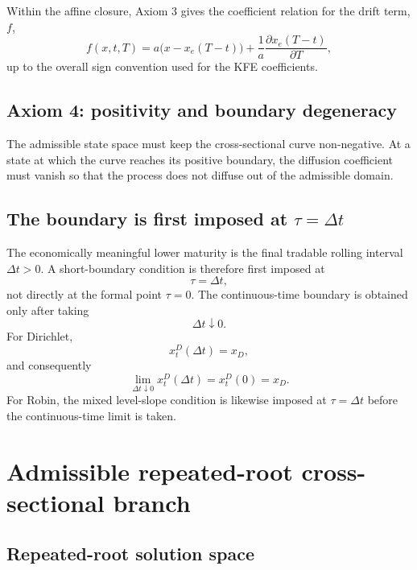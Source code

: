 \documentclass[12pt]{article}
\numberwithin{equation}{subsection}
\begin{document}
Within the affine closure, Axiom 3 gives the coefficient relation for the drift term, $f$,
\begin{equation}
f(x,t,T)
=
a\bigl(x-x_e(T-t)\bigr)
+
\frac{1}{a}\frac{\partial x_e(T-t)}{\partial T},
\end{equation}
up to the overall sign convention used for the KFE coefficients.

\subsection{Axiom 4: positivity and boundary degeneracy}

The admissible state space must keep the cross-sectional curve non-negative. At a state at which the curve reaches its positive boundary, the diffusion coefficient must vanish so that the process does not diffuse out of the admissible domain.

\subsection{The boundary is first imposed at $\tau=\Delta t$}

The economically meaningful lower maturity is the final tradable rolling interval $\Delta t>0$. A short-boundary condition is therefore first imposed at
\begin{equation}
\tau=\Delta t,
\end{equation}
not directly at the formal point $\tau=0$. The continuous-time boundary is obtained only after taking
\begin{equation}
\Delta t\downarrow0.
\end{equation}
For Dirichlet,
\begin{equation}
x^D_t(\Delta t)=x_D,
\end{equation}
and consequently
\begin{equation}
\lim_{\Delta t\downarrow0}x^D_t(\Delta t)=x^D_t(0)=x_D.
\end{equation}
For Robin, the mixed level-slope condition is likewise imposed at $\tau=\Delta t$ before the continuous-time limit is taken.

\section{Admissible repeated-root cross-sectional branch}

\subsection{Repeated-root solution space}
\end{document}
